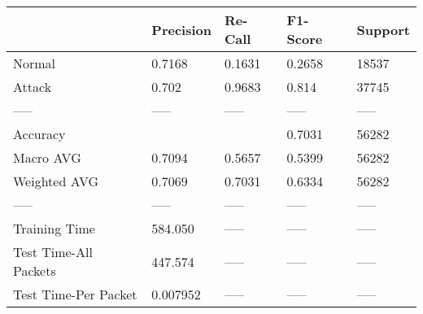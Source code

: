 \begin{tabular}{lllll}
\toprule
{} & Precision & Re-Call & F1-Score & Support \\
\midrule
Normal                &    0.7168 &  0.1631 &   0.2658 &   18537 \\
Attack                &     0.702 &  0.9683 &    0.814 &   37745 \\
-----                 &     ----- &   ----- &    ----- &   ----- \\
Accuracy              &           &         &   0.7031 &   56282 \\
Macro AVG             &    0.7094 &  0.5657 &   0.5399 &   56282 \\
Weighted AVG          &    0.7069 &  0.7031 &   0.6334 &   56282 \\
-----                 &     ----- &   ----- &    ----- &   ----- \\
Training Time         &   584.050 &   ----- &    ----- &   ----- \\
Test Time-All Packets &   447.574 &   ----- &    ----- &   ----- \\
Test Time-Per Packet  &  0.007952 &   ----- &    ----- &   ----- \\
\bottomrule
\end{tabular}
